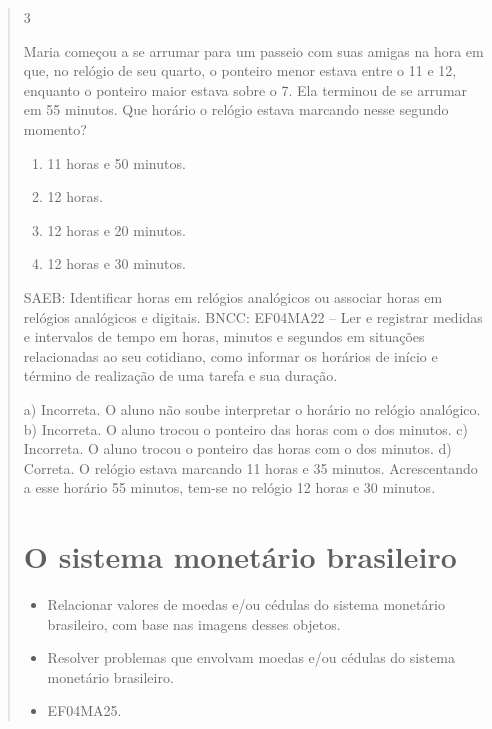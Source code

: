 \begin{mdframed}[linewidth=2pt,linecolor=salmao,roundcorner=2pt]
\begin{itemize}
{\begin{itemize}
\begin{escolha}
{\begin{quote}
\num{3}

Maria começou a se arrumar para um passeio com suas amigas na hora em
que, no relógio de seu quarto, o ponteiro menor estava entre o 11 e 12, enquanto o ponteiro maior estava sobre o 7. Ela terminou de se arrumar em 55 minutos. Que horário
o relógio estava marcando nesse segundo momento?

\begin{enumerate}
\item
  11 horas e 50 minutos.
\item
  12 horas.
\item
  12 horas e 20 minutos.
\item
  12 horas e 30 minutos.
\end{enumerate}

SAEB: Identificar horas em relógios analógicos ou associar horas em relógios analógicos e digitais.
BNCC: EF04MA22 -- Ler e registrar medidas e intervalos de tempo em horas, minutos e segundos em
situações relacionadas ao seu cotidiano, como informar os horários de início e término de realização
de uma tarefa e sua duração.

a) Incorreta. O aluno não soube interpretar o horário no relógio analógico.
b) Incorreta. O aluno trocou o ponteiro das horas com o dos minutos.
c) Incorreta. O aluno trocou o ponteiro das horas com o dos minutos.
d) Correta. O relógio estava marcando 11 horas e 35 minutos. Acrescentando a esse horário 55 minutos, tem-se no relógio 12 horas e 30 minutos.


\chapter{O sistema monetário brasileiro}


\begin{itemize}
\item Relacionar valores de moedas e/ou cédulas do sistema monetário
brasileiro, com base nas imagens desses objetos.
\item Resolver problemas que envolvam moedas e/ou cédulas do sistema
monetário brasileiro.
\end{itemize}


\begin{itemize}
  \item EF04MA25.
\end{itemize}


\end{quote}}
\end{escolha}
\end{itemize}}
\end{itemize}
\end{mdframed}
